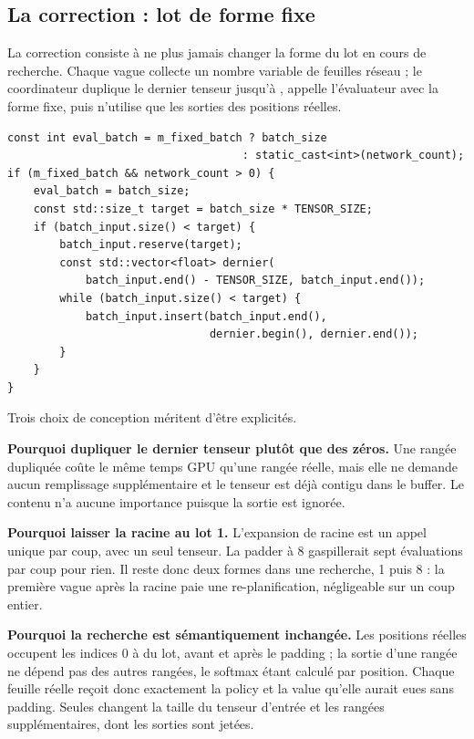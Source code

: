 \subsection{La correction : lot de forme fixe}

La correction consiste \`a ne plus jamais changer la forme du lot en cours de
recherche. Chaque vague collecte un nombre variable de feuilles
r\'eseau ; le coordinateur duplique le dernier tenseur jusqu'\`a
, appelle l'\'evaluateur avec la forme fixe, puis n'utilise
que les sorties des positions r\'eelles.

\begin{lstlisting}[caption={Padding d'une vague (extrait de \code{mcts\_wave.cpp}).}]
const int eval_batch = m_fixed_batch ? batch_size
                                    : static_cast<int>(network_count);
if (m_fixed_batch && network_count > 0) {
    eval_batch = batch_size;
    const std::size_t target = batch_size * TENSOR_SIZE;
    if (batch_input.size() < target) {
        batch_input.reserve(target);
        const std::vector<float> dernier(
            batch_input.end() - TENSOR_SIZE, batch_input.end());
        while (batch_input.size() < target) {
            batch_input.insert(batch_input.end(),
                               dernier.begin(), dernier.end());
        }
    }
}
\end{lstlisting}

Trois choix de conception m\'eritent d'\^etre explicit\'es.

\textbf{Pourquoi dupliquer le dernier tenseur plut\^ot que des z\'eros.} Une
rang\'ee dupliqu\'ee co\^ute le m\^eme temps GPU qu'une rang\'ee r\'eelle, mais
elle ne demande aucun remplissage suppl\'ementaire et le tenseur est d\'ej\`a
contigu dans le buffer. Le contenu n'a aucune importance puisque la sortie est
ignor\'ee.

\textbf{Pourquoi laisser la racine au lot 1.} L'expansion de racine est un
appel unique par coup, avec un seul tenseur. La padder \`a 8 gaspillerait sept
\'evaluations par coup pour rien. Il reste donc deux formes dans une recherche,
1 puis 8 : la premi\`ere vague apr\`es la racine paie une re-planification,
n\'egligeable sur un coup entier.

\textbf{Pourquoi la recherche est s\'emantiquement inchang\'ee.} Les positions
r\'eelles occupent les indices 0 \`a  du lot, avant et
apr\`es le padding ; la sortie d'une rang\'ee ne d\'epend pas des autres
rang\'ees, le softmax \'etant calcul\'e par position. Chaque feuille r\'eelle
re\c coit donc exactement la policy et la value qu'elle aurait eues sans
padding. Seules changent la taille du tenseur d'entr\'ee et les rang\'ees
suppl\'ementaires, dont les sorties sont jet\'ees.

